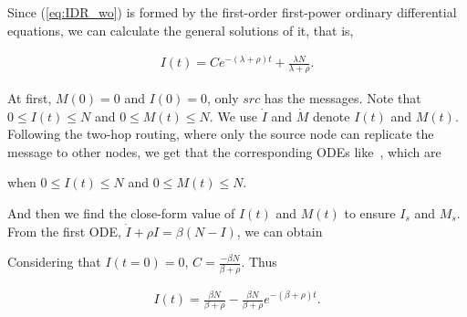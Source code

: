 Since (\ref{eq:IDR_wo}) is formed by the first-order first-power
ordinary differential equations,
we can calculate the general solutions of it, that is,
\begin{small}
\begin{equation}
\nonumber
\begin{aligned}
I(t) = C e^{-(\lambda + \rho)t} + \frac{ \lambda N }{ \lambda + \rho }.
\end{aligned}
\end{equation}
\end{small}

At first, $M(0)=0$ and $I(0)=0$, only $src$ has the messages.
Note that $0 \le I(t) \le N$ and $0 \le M(t) \le N$.
We use $\dot{I}$ and $\dot{M}$ denote $I(t)$ and $M(t)$.
Following the two-hop routing,
where only the source node can replicate the message to other nodes,
we get that the corresponding ODEs like~\cite{CC2007PerfAnaly}, which are

when $0 \le I(t) \le N$ and $0 \le M(t) \le N$.

And then we find the close-form value of $I(t)$ and $M(t)$ to ensure $I_{s}$ and $M_{s}$.
From the first ODE, $\dot{I} + \rho I = \beta (N-I)$, we can obtain

Considering that $I(t=0) = 0$, $C = \frac{ -\beta N }{ \beta + \rho }$.
Thus
\begin{small}
\begin{equation}
\nonumber
\begin{aligned}
I(t) = \frac{ \beta N }{ \beta + \rho } - \frac{ \beta N }{ \beta + \rho } e^{-(\beta + \rho)t}.
\end{aligned}
\end{equation}
\end{small}

